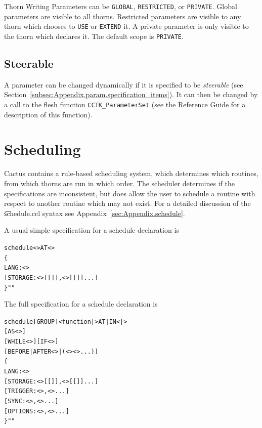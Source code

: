 \begin{cactuspart}{Thorn Writing}
Parameters can be \texttt{GLOBAL}, \texttt{RESTRICTED}, or \texttt{PRIVATE}.
Global parameters are visible to all thorns.  Restricted parameters
are visible to any thorn which chooses to \texttt{USE} or \texttt{EXTEND}
it.  A private parameter is only visible to the thorn which declares
it.  The default scope is \texttt{PRIVATE}.

\subsection{Steerable}
\label{sec:Cactus_parameters.steerable}
A parameter can be changed dynamically if it is specified to be
\textit{steerable} (see
Section~\ref{subsec:Appendix.param.specification_items}).
It can then be changed by a call to the flesh function
\texttt{CCTK\_ParameterSet} (see the Reference Guide for a description
of this function).


\section{Scheduling}
\label{chap:scheduling}

Cactus contains a rule-based scheduling system, which determines which
routines, from which thorns are run in which order.  The scheduler
determines if the specifications are inconsistent, but does allow the
user to schedule a routine with respect to another routine which may not
exist.
For a detailed discussion of the {\t schedule.ccl} syntax see
Appendix~\ref{sec:Appendix.schedule}.

A usual simple specification for a schedule declaration is
\begin{alltt}schedule <> AT <>
\{
  LANG: <>
  [STORAGE:       <>[[]],<>[[]]...]
\} ""
\end{alltt}

The full specification for a schedule declaration is
\begin{alltt}schedule [GROUP] <function|> AT|IN <|>
         [AS <>]
         [WHILE <>] [IF <>]
         [BEFORE|AFTER <>|(<> <> ...)]
\{
  LANG: <>
  [STORAGE:       <>[[]],<>[[]]...]
  [TRIGGER:       <>,<>...]
  [SYNC:          <>,<>...]
  [OPTIONS:       <>,<>...]
\} ""
\end{alltt}


\end{cactuspart}
